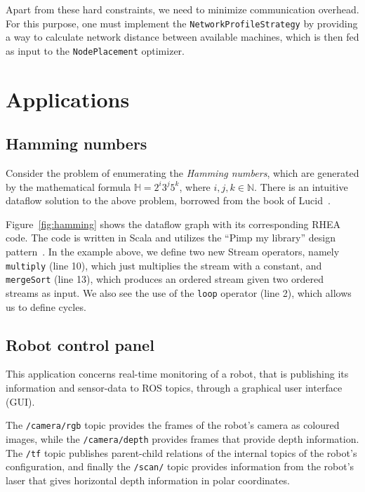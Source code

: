 \documentclass[sigplan,screen,review,anonymous]{acmart}
\begin{document}
Apart from these hard constraints, we need to minimize communication overhead.
For this purpose, one must implement the \texttt{NetworkProfileStrategy} by providing
a way to calculate network distance between available machines, which is then
fed as input to the \texttt{NodePlacement} optimizer.

\section{Applications} \label{sec:applications}

\subsection{Hamming numbers}

Consider the problem of enumerating the
\textit{Hamming numbers}, which are generated by the mathematical formula
$\mathbb{H} = 2^i3^j5^k$, where $i,j,k \in \mathbb{N}$. There is an intuitive
dataflow solution to the above problem, borrowed from the book of Lucid~\cite{lucid}.

Figure~\ref{fig:hamming} shows the dataflow graph with its corresponding \textsc{RHEA}
code.
%
%
The code is written in Scala and utilizes the ``Pimp my library'' design
pattern~\cite{pimp}. In the example above, we define two new Stream operators,
namely \texttt{multiply} (line 10), which just multiplies the stream with a constant, and
\texttt{mergeSort} (line 13), which produces an ordered stream given two ordered
streams as input. We also see the use of the \texttt{loop} operator (line 2),
which allows us to define cycles.

\subsection{Robot control panel}

This application concerns real-time monitoring of a robot, that is publishing
its information and sensor-data to ROS topics, through a
graphical user interface (GUI).

The \texttt{/camera/rgb} topic provides the frames of the robot's camera as
coloured images, while the \texttt{/camera/depth} provides frames that provide
depth information. The \texttt{/tf} topic publishes parent-child relations of
the internal topics of the robot's configuration, and finally the
\texttt{/scan/} topic provides information from the robot's laser that gives
horizontal depth information in polar coordinates.
\end{document}
